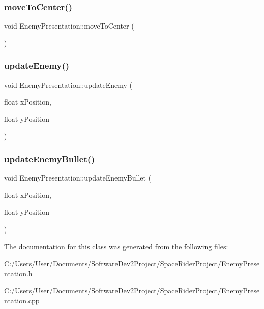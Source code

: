 \mbox{\label{class_enemy_presentation_a8e6b10042366b1af3ddd99878cae36a9}} 
\subsubsection{\texorpdfstring{move\+To\+Center()}{moveToCenter()}}
{\footnotesize\ttfamily void Enemy\+Presentation\+::move\+To\+Center (\begin{DoxyParamCaption}{ }\end{DoxyParamCaption})}

\mbox{\label{class_enemy_presentation_adc38a8f56b24ec4aea9157dd74884b40}} 
\subsubsection{\texorpdfstring{update\+Enemy()}{updateEnemy()}}
{\footnotesize\ttfamily void Enemy\+Presentation\+::update\+Enemy (\begin{DoxyParamCaption}\item[{float}]{x\+Position,  }\item[{float}]{y\+Position }\end{DoxyParamCaption})}

\mbox{\label{class_enemy_presentation_ad7d1f196be857ea51b2ced17b5199b40}} 
\subsubsection{\texorpdfstring{update\+Enemy\+Bullet()}{updateEnemyBullet()}}
{\footnotesize\ttfamily void Enemy\+Presentation\+::update\+Enemy\+Bullet (\begin{DoxyParamCaption}\item[{float}]{x\+Position,  }\item[{float}]{y\+Position }\end{DoxyParamCaption})}



The documentation for this class was generated from the following files\+:\begin{DoxyCompactItemize}
\item 
C\+:/\+Users/\+User/\+Documents/\+Software\+Dev2\+Project/\+Space\+Rider\+Project/\hyperlink{_enemy_presentation_8h}{Enemy\+Presentation.\+h}\item 
C\+:/\+Users/\+User/\+Documents/\+Software\+Dev2\+Project/\+Space\+Rider\+Project/\hyperlink{_enemy_presentation_8cpp}{Enemy\+Presentation.\+cpp}\end{DoxyCompactItemize}
